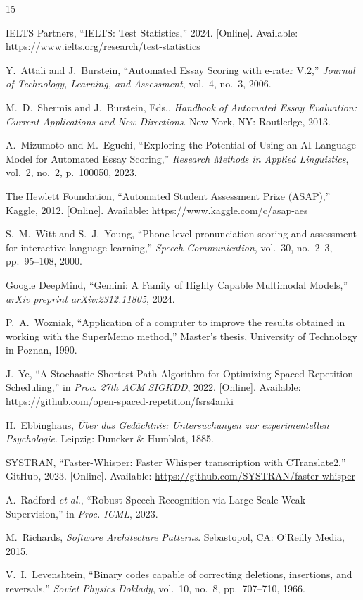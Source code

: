 \documentclass{IEEEtran}
\begin{document}
\begin{thebibliography}{15}

IELTS Partners, ``IELTS: Test Statistics,'' 2024. [Online]. Available: \url{https://www.ielts.org/research/test-statistics}

Y.~Attali and J.~Burstein, ``Automated Essay Scoring with e-rater V.2,'' \textit{Journal of Technology, Learning, and Assessment}, vol.~4, no.~3, 2006.

M.~D.~Shermis and J.~Burstein, Eds., \textit{Handbook of Automated Essay Evaluation: Current Applications and New Directions}. New York, NY: Routledge, 2013.

A.~Mizumoto and M.~Eguchi, ``Exploring the Potential of Using an AI Language Model for Automated Essay Scoring,'' \textit{Research Methods in Applied Linguistics}, vol.~2, no.~2, p.~100050, 2023.

The Hewlett Foundation, ``Automated Student Assessment Prize (ASAP),'' Kaggle, 2012. [Online]. Available: \url{https://www.kaggle.com/c/asap-aes}

S.~M.~Witt and S.~J.~Young, ``Phone-level pronunciation scoring and assessment for interactive language learning,'' \textit{Speech Communication}, vol.~30, no.~2--3, pp.~95--108, 2000.

Google DeepMind, ``Gemini: A Family of Highly Capable Multimodal Models,'' \textit{arXiv preprint arXiv:2312.11805}, 2024.

P.~A.~Wozniak, ``Application of a computer to improve the results obtained in working with the SuperMemo method,'' Master's thesis, University of Technology in Poznan, 1990.

J.~Ye, ``A Stochastic Shortest Path Algorithm for Optimizing Spaced Repetition Scheduling,'' in \textit{Proc. 27th ACM SIGKDD}, 2022. [Online]. Available: \url{https://github.com/open-spaced-repetition/fsrs4anki}

H.~Ebbinghaus, \textit{{\"U}ber das Ged{\"a}chtnis: Untersuchungen zur experimentellen Psychologie}. Leipzig: Duncker \& Humblot, 1885.

SYSTRAN, ``Faster-Whisper: Faster Whisper transcription with CTranslate2,'' GitHub, 2023. [Online]. Available: \url{https://github.com/SYSTRAN/faster-whisper}

A.~Radford \textit{et al.}, ``Robust Speech Recognition via Large-Scale Weak Supervision,'' in \textit{Proc. ICML}, 2023.

M.~Richards, \textit{Software Architecture Patterns}. Sebastopol, CA: O'Reilly Media, 2015.

V.~I.~Levenshtein, ``Binary codes capable of correcting deletions, insertions, and reversals,'' \textit{Soviet Physics Doklady}, vol.~10, no.~8, pp.~707--710, 1966.

\end{thebibliography}
\end{document}
